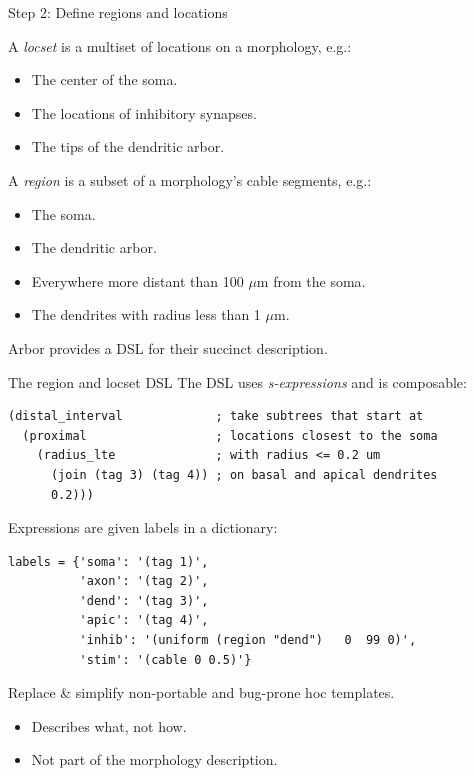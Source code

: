 \documentclass[aspectratio=43]{beamer}
\newcommand{\arbor}{{\ttfamily Arbor}\xspace}
\begin{document}
\begin{frame}[fragile]{Step 2: Define regions and locations}

    A \emph{locset} is a multiset of locations on a morphology, e.g.:
    \begin{itemize}
        \item The center of the soma.
        \item The locations of inhibitory synapses.
        \item The tips of the dendritic arbor.
    \end{itemize}
    \vspace{5pt}

    A \emph{region} is a subset of a morphology's cable segments, e.g.:
    \begin{itemize}
        \item The soma.
        \item The dendritic arbor.
        \item Everywhere more distant than 100 $\mu$m from the soma.
        \item The dendrites with radius less than 1 $\mu$m.
    \end{itemize}
    \vspace{5pt}
    \arbor provides a DSL for their succinct description.

\end{frame}

\begin{frame}[fragile]{The region and locset DSL}
    The DSL uses \emph{s-expressions} and is composable:

    \begin{lstlisting}[style=arblang]
(distal_interval             ; take subtrees that start at
  (proximal                  ; locations closest to the soma
    (radius_lte              ; with radius <= 0.2 um
      (join (tag 3) (tag 4)) ; on basal and apical dendrites
      0.2)))
    \end{lstlisting}

    Expressions are given labels in a dictionary:

    \begin{lstlisting}[style=talkpython]
labels = {'soma': '(tag 1)',
          'axon': '(tag 2)',
          'dend': '(tag 3)',
          'apic': '(tag 4)',
          'inhib': '(uniform (region "dend")   0  99 0)',
          'stim': '(cable 0 0.5)'}
    \end{lstlisting}

    Replace \& simplify non-portable and bug-prone hoc templates.
    \begin{itemize}
        \item Describes what, not how.
        \item Not part of the morphology description.
    \end{itemize}

\end{frame}
\end{document}
